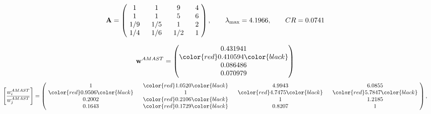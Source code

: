\begin{example}
\begin{equation*}
\mathbf{A} =
\begin{pmatrix}
$\,\,$ 1 $\,\,$ & $\,\,$1$\,\,$ & $\,\,$9$\,\,$ & $\,\,$4 $\,\,$ \\
$\,\,$ 1 $\,\,$ & $\,\,$ 1 $\,\,$ & $\,\,$5$\,\,$ & $\,\,$6 $\,\,$ \\
$\,\,$ 1/9$\,\,$ & $\,\,$ 1/5$\,\,$ & $\,\,$ 1 $\,\,$ & $\,\,$2 $\,\,$ \\
$\,\,$ 1/4$\,\,$ & $\,\,$ 1/6$\,\,$ & $\,\,$ 1/2$\,\,$ & $\,\,$ 1  $\,\,$ \\
\end{pmatrix},
\qquad
\lambda_{\max} =
4.1966,
\qquad
CR = 0.0741
\end{equation*}

\begin{equation*}
\mathbf{w}^{AMAST} =
\begin{pmatrix}
0.431941\\
\color{red} 0.410594\color{black} \\
0.086486\\
0.070979
\end{pmatrix}\end{equation*}
\begin{equation*}
\left[ \frac{{w}^{AMAST}_i}{{w}^{AMAST}_j} \right] =
\begin{pmatrix}
$\,\,$ 1 $\,\,$ & $\,\,$\color{red} 1.0520\color{black} $\,\,$ & $\,\,$4.9943$\,\,$ & $\,\,$6.0855$\,\,$ \\
$\,\,$\color{red} 0.9506\color{black} $\,\,$ & $\,\,$ 1 $\,\,$ & $\,\,$\color{red} 4.7475\color{black} $\,\,$ & $\,\,$\color{red} 5.7847\color{black}   $\,\,$ \\
$\,\,$0.2002$\,\,$ & $\,\,$\color{red} 0.2106\color{black} $\,\,$ & $\,\,$ 1 $\,\,$ & $\,\,$1.2185 $\,\,$ \\
$\,\,$0.1643$\,\,$ & $\,\,$\color{red} 0.1729\color{black} $\,\,$ & $\,\,$0.8207$\,\,$ & $\,\,$ 1  $\,\,$ \\
\end{pmatrix},
\end{equation*}


\end{example}
